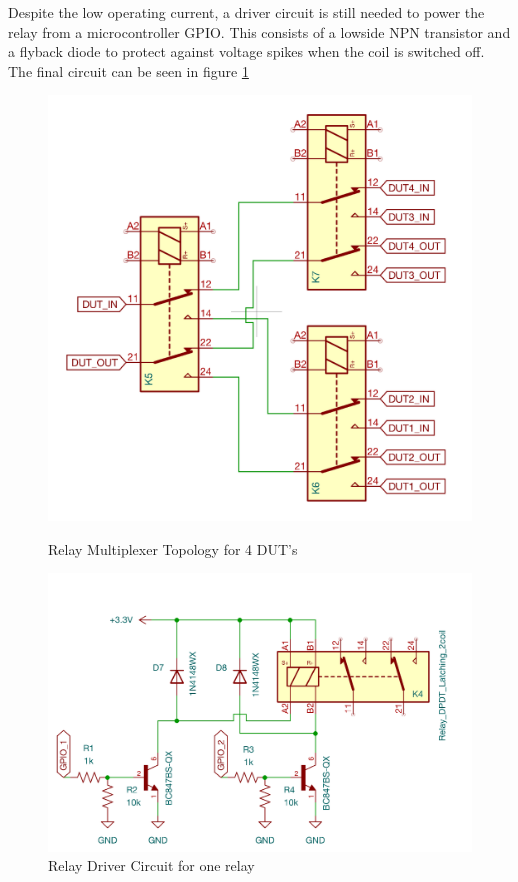 Despite the low operating current, a driver circuit is still needed to power the relay from a microcontroller GPIO. This consists of a lowside NPN transistor and a flyback diode to protect against voltage spikes when the coil is switched off. The final circuit can be seen in figure \ref{fig:relay_circuit}

\begin{figure}[H]
    \centering
    \begin{minipage}{0.35\textwidth}
        \centering
        \includegraphics[width=\textwidth]{RelayTopologySchem.png}
        \caption{Relay Multiplexer Topology for 4 DUT's}
        \label{fig:relay_topology}
    \end{minipage}\hfill
    \begin{minipage}{0.6\textwidth}
        \centering
        \includegraphics[width=\textwidth]{RelayDriverSchem.png}
        \caption{Relay Driver Circuit for one relay}
        \label{fig:relay_circuit}
    \end{minipage}
\end{figure}

